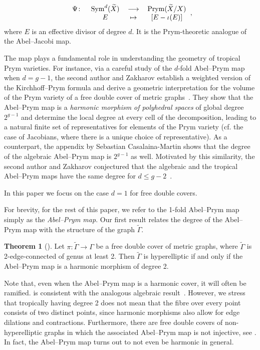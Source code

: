 \documentclass[11pt]{article}
\theoremstyle{definition}
\numberwithin{equation}{section}
\newtheorem{maintheorem}{Theorem}
\theoremstyle{definition}
\newcommand{\tGa}{\widetilde{\Gamma}}
\DeclareMathOperator{\Sym}{Sym}
\newcommand{\wt}[1]{\widetilde{#1}}
\DeclareMathOperator{\Prym}{Prym}
\begin{document}
\[
 \begin{tabular}{cccc}	    $\Psi\colon$&$\Sym^d(\wt X)$&$\longrightarrow$&$\Prym(\wt X/X)$  \\
	         &$E$&$\mapsto$&$[E - \iota(E)]$ \\
	    \end{tabular},
\]
where $E$ is an effective divisor of degree $d$. It is the Prym-theoretic analogue of the Abel--Jacobi map. 


The map plays a fundamental role in understanding the geometry of tropical Prym varieties. 
For instance, via a careful study of the $d$-fold Abel--Prym map  when $d=g-1$, 
the second author and Zakharov establish a weighted version of the Kirchhoff--Prym   formula and derive a geometric interpretation for the volume of the Prym variety of a free double cover of metric graphs~\cite[Theorem 3.4]{LZ22}. 
They show that the Abel--Prym map is a \emph{harmonic morphism of polyhedral spaces} of global degree $2^{g-1}$ and determine the local degree at every cell of the decomposition, leading to a natural finite set of representatives  for elements of the Prym variety (cf. the case of Jacobians, where there is a unique choice of representative). 
As a counterpart, the appendix by Sebastian Casalaina-Martin 
shows that the degree of the algebraic Abel--Prym map is $2^{g-1}$ as well.
Motivated by this similarity, the second author and Zakharov
conjectured that the algebraic and the tropical Abel--Prym maps have the same degree for $d\leq g-2$~\cite[Conjecture 1.1]{LZ22}. 

In this paper we focus on the case $d=1$ for free double covers. 

For brevity, for the rest of this paper, we  refer to the 1-fold Abel--Prym map simply as the \emph{Abel--Prym map}. 
Our first result relates the degree of the Abel--Prym map with the structure of the graph $\wt\Gamma$.



\begin{maintheorem}[]\label{maintheorem:degreeOfAbelPrym}
    Let $\pi\colon \tGa\to \Gamma$ be a free double cover of  metric graphs, where $\wt\Gamma$ is 2-edge-connected of genus at least 2.  Then $\wt\Gamma$ is hyperelliptic if and only if the Abel--Prym map  
    is a harmonic morphism of degree 2.
    \end{maintheorem}



Note that, even when  the Abel--Prym map is a  harmonic cover, it will often be ramified. 
 is consistent with the analogous algebraic result~\cite[Proposition~12.5.2(b)]{BL04}. 
However, we stress that tropically having degree 2 does not mean that the fibre over every point consists of two distinct points, since harmonic morphisms also allow for edge dilations and contractions. 
Furthermore, 
there are free double covers of non-hyperelliptic graphs in which the associated Abel--Prym map is not injective, see . In fact, the Abel--Prym map turns out to not even be harmonic in general. 
\end{document}
